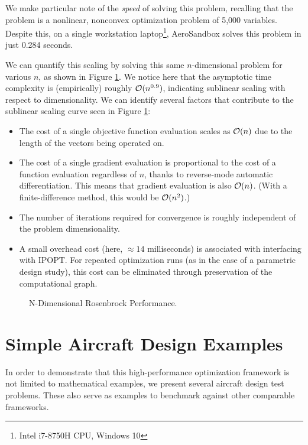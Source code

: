 We make particular note of the \textit{speed} of solving this problem, recalling that the problem is a nonlinear, nonconvex optimization problem of 5,000 variables. Despite this, on a single workstation laptop\footnote{Intel i7-8750H CPU, Windows 10}, AeroSandbox solves this problem in just 0.284 seconds.

We can quantify this scaling by solving this same $n$-dimensional problem for various $n$, as shown in Figure \ref{fig:nd-rosen}. We notice here that the asymptotic time complexity is (empirically) roughly $\mathcal{O}(n^{0.9})$, indicating sublinear scaling with respect to dimensionality. We can identify several factors that contribute to the sublinear scaling curve seen in Figure \ref{fig:nd-rosen}:

\begin{itemize}
    \item The cost of a single objective function evaluation scales as $\mathcal{O}(n)$ due to the length of the vectors being operated on.
    \item The cost of a single gradient evaluation is proportional to the cost of a function evaluation regardless of $n$, thanks to reverse-mode automatic differentiation. This means that gradient evaluation is also $\mathcal{O}(n)$. (With a finite-difference method, this would be $\mathcal{O}(n^2)$.)
    \item The number of iterations required for convergence is roughly independent of the problem dimensionality.
    \item A small overhead cost (here, $\approx 14$ milliseconds) is associated with interfacing with IPOPT. For repeated optimization runs (as in the case of a parametric design study), this cost can be eliminated through preservation of the computational graph. %
\end{itemize}

\begin{figure}[H]
    \centering
    \ifdraft{}{}
    \caption{N-Dimensional Rosenbrock Performance. }
    \label{fig:nd-rosen}
\end{figure}


\section{Simple Aircraft Design Examples}

In order to demonstrate that this high-performance optimization framework is not limited to mathematical examples, we present several aircraft design test problems. These also serve as examples to benchmark against other comparable frameworks.

